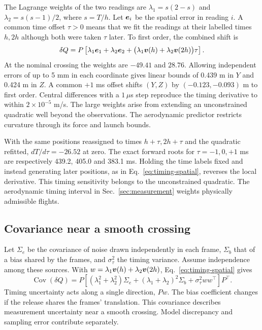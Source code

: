 The Lagrange weights of the two readings are \(\lambda_1=s(2-s)\) and \(\lambda_2=s(s-1)/2\), where \(s=T/h\). Let \(\boldsymbol{e}_i\) be the spatial error in reading \(i\). A common time offset \(\tau>0\) means that we fit the readings at their labelled times \(h,2h\) although both were taken \(\tau\) later. To first order, the combined shift is
\begin{equation}
 \delta Q=P\left[\lambda_1\boldsymbol{e}_1+\lambda_2\boldsymbol{e}_2+
        \bigl(\lambda_1\boldsymbol{v}(h)+\lambda_2\boldsymbol{v}(2h)\bigr)\tau\right].
 \label{eq:timing-spatial}
\end{equation}
At the nominal crossing the weights are \(-49.41\) and \(28.76\). Allowing independent errors of up to 5 mm in each coordinate gives linear bounds of 0.439 m in \(Y\) and 0.424 m in \(Z\). A common \(+1\) ms offset shifts \((Y,Z)\) by \((-0.123,-0.093)\) m to first order. Central differences with a \(1\,\mu\)s step reproduce the timing derivative to within \(2\times10^{-5}\) m/s. The large weights arise from extending an unconstrained quadratic well beyond the observations. The aerodynamic predictor restricts curvature through its force and launch bounds.

With the same positions reassigned to times \(h+\tau,2h+\tau\) and the quadratic refitted, \(dT/d\tau=-26.52\) at zero. The exact forward roots for \(\tau=-1,0,+1\) ms are respectively 439.2, 405.0 and 383.1 ms. Holding the time labels fixed and instead generating later positions, as in Eq.~\eqref{eq:timing-spatial}, reverses the local derivative. This timing sensitivity belongs to the unconstrained quadratic. The aerodynamic timing interval in Sec.~\ref{sec:measurement} weights physically admissible flights.

\subsection{Covariance near a smooth crossing}
Let \(\Sigma_e\) be the covariance of noise drawn independently in each frame, \(\Sigma_b\) that of a bias shared by the frames, and \(\sigma_\tau^2\) the timing variance. Assume independence among these sources. With \(w=\lambda_1\boldsymbol{v}(h)+\lambda_2\boldsymbol{v}(2h)\), Eq.~\eqref{eq:timing-spatial} gives
\begin{equation}
 \operatorname{Cov}(\delta Q)=
 P\left[(\lambda_1^2+\lambda_2^2)\Sigma_e+
        (\lambda_1+\lambda_2)^2\Sigma_b+
        \sigma_\tau^2 ww^\top\right]P^\top.
\end{equation}
Timing uncertainty acts along a single direction, \(Pw\). The bias coefficient changes if the release shares the frames' translation. This covariance describes measurement uncertainty near a smooth crossing. Model discrepancy and sampling error contribute separately.

